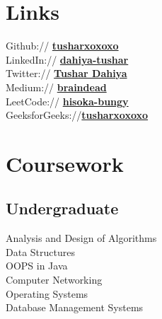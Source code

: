 \documentclass[]{deedy-resume-openfont}
\begin{document}
\begin{minipage}[t]{0.33\textwidth}
\section{Links} 
Github:// \href{https://github.com/tusharxoxoxo}{\bf tusharxoxoxo} \\
LinkedIn://  \href{https://www.linkedin.com/in/dahiya-tushar/}{\bf dahiya-tushar} \\
 Twitter://  \href{https://twitter.com/blouse_man}{\bf Tushar Dahiya} \\
Medium://  \href{https://brain-dead.medium.com/}{\bf braindead}\\
LeetCode:// \href{https://leetcode.com/hisoka_bungy/}{\bf hisoka-bungy}\\
GeeksforGeeks://\href{https://auth.geeksforgeeks.org/user/tusharxoxoxo/practice/}{\bf tusharxoxoxo}


\section{Coursework}


\subsection{Undergraduate}
Analysis and Design of Algorithms \\
Data Structures \\
OOPS in Java\\
Computer Networking\\
Operating Systems \\
Database Management Systems\\



\end{minipage}
\end{document}
